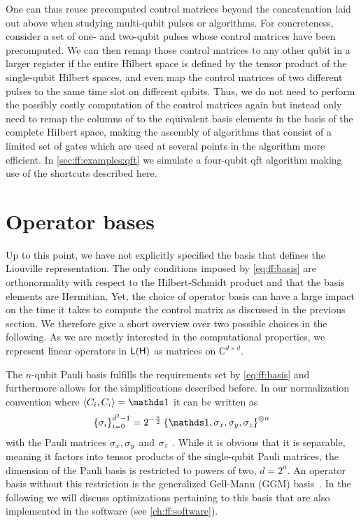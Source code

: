 One can thus reuse precomputed control matrices beyond the concatenation laid out above when studying multi-qubit pulses or algorithms.
For concreteness, consider a set of one- and two-qubit pulses whose control matrices have been precomputed.
We can then remap those control matrices to any other qubit in a larger register if the entire Hilbert space is defined by the tensor product of the single-qubit Hilbert spaces, and even map the control matrices of two different pulses to the same time slot on different qubits.
Thus, we do not need to perform the possibly costly computation of the control matrices again but instead only need to remap the columns of \ctrlmat to the equivalent basis elements in the basis of the complete Hilbert space, making the assembly of algorithms that consist of a limited set of gates which are used at several points in the algorithm more efficient.
In \cref{sec:ff:examples:qft} we simulate a four-qubit \gls{qft} algorithm making use of the shortcuts described here.

\section{Operator bases}\label{sec:ff:performance:basis}
Up to this point, we have not explicitly specified the basis that defines the Liouville representation.
The only conditions imposed by \cref{eq:ff:basis} are orthonormality with respect to the Hilbert-Schmidt product and that the basis elements are Hermitian.
Yet, the choice of operator basis can have a large impact on the time it takes to compute the control matrix as discussed in the previous section.
We therefore give a short overview over two possible choices in the following.
As we are mostly interested in the computational properties, we represent linear operators in $\mathsf{L}(\mathsf{H})$ as matrices on $\mathbb{C}^{d\times d}$.

The $n$-qubit Pauli basis fulfills the requirements set by \cref{eq:ff:basis} and furthermore allows for the simplifications described before.
In our normalization convention where $\dotHS{C_i}{C_i} = \eye$ it can be written as
\begin{equation}\label{eq:ff:basis:pauli}
\left\lbrace\sigma_i\right\rbrace_{i=0}^{d^2-1} = 2^{-\frac{n}{2}}\left\lbrace \eye, \sx, \sy, \sz \right\rbrace^{\otimes n}
\end{equation}
with the Pauli matrices $\sigma_x,\sigma_y$ and $\sigma_z$ .
While it is obvious that it is separable, meaning it factors into tensor products of the single-qubit Pauli matrices, the dimension of the Pauli basis is restricted to powers of two, \ie $d = 2^n$.
An operator basis without this restriction is the generalized Gell-Mann (GGM) basis~\cite{Kimura2003,Bertlmann2008}.
In the following we will discuss optimizations pertaining to this basis that are also implemented in the software (see \cref{ch:ff:software}).

